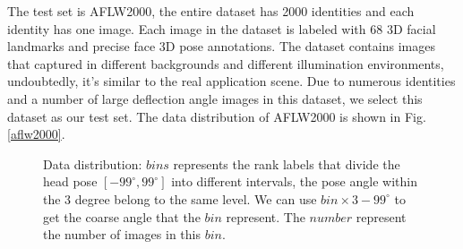 \documentclass[english]{DDCLSconf}
\begin{document}
The test set is AFLW2000, the entire dataset has 2000 identities and each identity has one image. Each image in the dataset is labeled with 68 3D facial landmarks and precise face 3D pose annotations. The dataset contains images that captured in different backgrounds and different illumination environments, undoubtedly, it's similar to the real application scene. Due to numerous identities and a number of large deflection angle images in this dataset, we select this dataset as our test set. The data distribution of AFLW2000 is shown in Fig.\ref{aflw2000}.


\begin{figure}[!htb]
	\centering
	
	
	\caption{Data distribution: $bins$ represents the rank labels that divide the head pose $[-99^{\circ}, 99^{\circ}]$ into different intervals, the pose angle within the 3 degree belong to the same level. We can use $bin\times 3-99^{\circ}$ to get the coarse angle that the $bin$ represent. The $number$ represent the number of images in this $bin$.}
	\label{data_distribution}       %
	
\end{figure}
\end{document}
